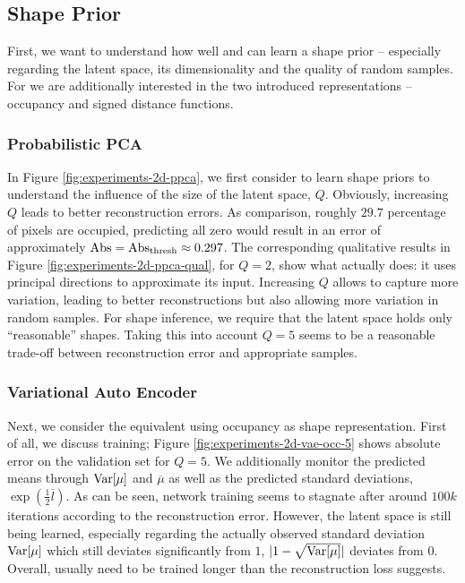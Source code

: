 \subsection{Shape Prior}

First, we want to understand how well \PPCA and \VAEs can learn a shape prior
-- especially regarding the latent space, \eg its dimensionality and the
quality of random samples.
For \VAEs we are additionally interested in the two introduced representations
-- occupancy and signed distance functions.

\subsubsection{Probabilistic PCA}




In Figure \ref{fig:experiments-2d-ppca}, we first consider \PPCA to learn shape priors
to understand the influence of the size of the latent space, \ie $Q$.
Obviously, increasing $Q$ leads to better reconstruction errors.
As comparison, roughly $29.7$ percentage of
pixels are occupied, \ie predicting all zero would result in an error of
approximately $\Abs = \AbsThr \approx 0.297$.  The corresponding
qualitative results in Figure \ref{fig:experiments-2d-ppca-qual}, for $Q = 2$, show
what \PPCA actually does: it uses principal directions to approximate
its input. Increasing $Q$ allows \PPCA to capture more variation, leading
to better reconstructions but also allowing more variation in random samples.
For shape inference, we require that the latent space holds only ``reasonable''
shapes. Taking this into account $Q = 5$ seems to be
a reasonable trade-off between reconstruction error and appropriate samples.

\subsubsection{Variational Auto Encoder}
\label{sec:experiments-2d-vae-prior}




Next, we consider the \VAE equivalent using occupancy as shape representation.
First of all, we discuss training; Figure \ref{fig:experiments-2d-vae-occ-5}
shows absolute error \Abs on the validation set for $Q = 5$.
We additionally monitor the predicted means through $\mathrm{Var}[\mu]$ and $\overline{\mu}$
as well as the predicted standard deviations, \ie $\exp(\frac{1}{2}\overline{l})$.
As can be seen, network training seems to stagnate after around $100k$
iterations according to the reconstruction error.
However, the latent space is still being learned, especially regarding the actually
observed standard deviation $\mathrm{Var}[\mu]$ which still deviates significantly from $1$,
\ie $|1 - \sqrt{\mathrm{Var}[\mu]}|$ deviates from $0$.
Overall, \VAEs usually need to be trained longer than the reconstruction loss suggests.

